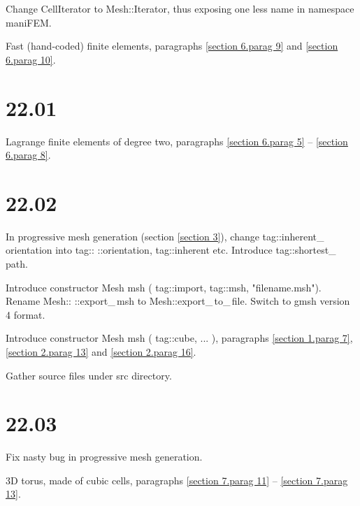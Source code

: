 \documentclass[a4paper]{scrreprt}
\def\numb{}
\newcommand\azul[1]{\textcolor{nova}{#1}}
\newcommand\verm[1]{\textcolor{manif}{#1}}
\newcommand\verde[1]{\textcolor{string}{#1}}
\renewcommand\tt{\normalfont\ttfamily}
\begin{document}
\noindent Change {\small\tt\verm{CellIterator}} to {\small\tt\verm{Mesh}::Iterator},
thus exposing one less name in {\small\tt namespace \verm{maniFEM}}.

\noindent Fast (hand-coded) finite elements, paragraphs \ref{\numb section 6.\numb parag 9}
and \ref{\numb section 6.\numb parag 10}.


\section*{22.01}

\noindent Lagrange finite elements of degree two, paragraphs \ref{\numb section 6.\numb parag 5}
-- \ref{\numb section 6.\numb parag 8}.


\section*{22.02}

\noindent In progressive mesh generation (section \ref{\numb section 3}), change
{\small\tt\textcolor{tag}{tag}::inherent\_\,orientation} into
{\small\tt\textcolor{tag}{tag}::} {\small\tt::orientation,} {\small\tt\textcolor{tag}{tag}::inherent} etc.
Introduce {\small\tt\textcolor{tag}{tag}::shortest\_\,path}.

\noindent Introduce constructor {\small\tt\verm{Mesh}} {\small\tt \azul{msh}} {\small\tt (}
{\small\tt\textcolor{tag}{tag}::import,} {\small\tt \textcolor{tag}{tag}::msh,}
{\small\tt\verde{"filename.msh"})}.
\noindent Rename {\small\tt\verm{Mesh}::} {\small\tt::export\_\,msh} to
{\small\tt\verm{Mesh}::export\_\,to\_\,file}.
Switch to {\small\tt gmsh} version 4 format.          

\noindent Introduce constructor {\small\tt\verm{Mesh}} {\small\tt \azul{msh}} {\small\tt (}
{\small\tt\textcolor{tag}{tag}::cube,} {\small\tt ...} {\small\tt )}, paragraphs
\ref{\numb section 1.\numb parag 7}, \ref{\numb section 2.\numb parag 13} and
\ref{\numb section 2.\numb parag 16}.

\noindent Gather source files under {\small\tt src} directory.


\section*{22.03}

\noindent Fix nasty bug in progressive mesh generation.

\noindent 3D torus, made of cubic cells, paragraphs \ref{\numb section 7.\numb parag 11} --
\ref{\numb section 7.\numb parag 13}.
\end{document}
